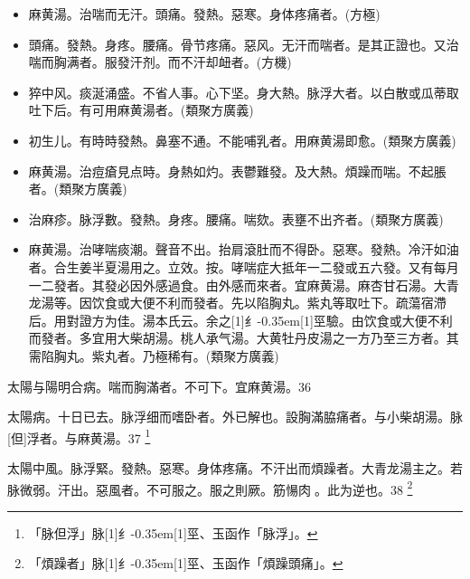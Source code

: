 \documentclass[11pt,oneside,b5paper]{ctexbook}
\begin{document}
\begin{flushleft}
\begin{itemize}
\item 麻黄湯。治喘而无汗。頭痛。發熱。惡寒。身体疼痛者。(方極)
\item 頭痛。發熱。身疼。腰痛。骨节疼痛。惡风。无汗而喘者。是其正證也。又治喘而胸满者。服發汗剂。而不汗却衄者。(方機)
\item 猝中风。痰涎涌盛。不省人事。心下坚。身大熱。脉浮大者。以白散或瓜蒂取吐下后。有可用麻黄湯者。(類聚方廣義)
\item 初生儿。有時時發熱。鼻塞不通。不能哺乳者。用麻黄湯即愈。(類聚方廣義)
\item 麻黄湯。治痘瘡見点時。身熱如灼。表鬱難發。及大熱。煩躁而喘。不起脹者。(類聚方廣義)
\item 治麻疹。脉浮數。發熱。身疼。腰痛。喘欬。表壅不出齐者。(類聚方廣義)
\item 麻黄湯。治哮喘痰潮。聲音不出。抬肩滾肚而不得卧。惡寒。發熱。冷汗如油者。合生姜半夏湯用之。立效。按。哮喘症大抵年一二發或五六發。又有每月一二發者。其發必因外感過食。由外感而來者。宜麻黄湯。麻杏甘石湯。大青龙湯等。因饮食或大便不利而發者。先以陷胸丸。紫丸等取吐下。疏蕩宿滯后。用對證方为佳。湯本氏云。余之{\hbox{\scalebox{0.68}[1]{纟}\kern-0.35em\scalebox{0.64}[1]{巠}}}驗。由饮食或大便不利而發者。多宜用大柴胡湯。桃人承气湯。大黄牡丹皮湯之一方乃至三方者。其需陷胸丸。紫丸者。乃極稀有。(類聚方廣義)
\end{itemize}

太陽与陽明合病。喘而胸滿者。不可下。宜麻黄湯。36

太陽病。十日已去。脉浮细而嗜卧者。外已解也。設胸滿脇痛者。与小柴胡湯。脉[但]浮者。与麻黄湯。37
\footnote{「脉但浮」脉{\hbox{\scalebox{0.68}[1]{纟}\kern-0.35em\scalebox{0.64}[1]{巠}}}、玉函作「脉浮」。}

太陽中風。脉浮緊。發熱。惡寒。身体疼痛。不汗出而煩躁者。大青龙湯主之。若脉微弱。汗出。惡風者。不可服之。服之則厥。筋愓肉{𥆧}。此为逆也。38
\footnote{「煩躁者」脉{\hbox{\scalebox{0.68}[1]{纟}\kern-0.35em\scalebox{0.64}[1]{巠}}}、玉函作「煩躁頭痛」。}


\end{flushleft}
\end{document}
